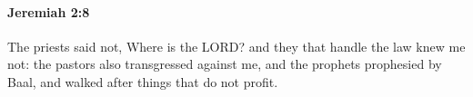 
		\paragraph{Jeremiah 2:8} %
			\label{JEREMIAH-2-8}

			The priests said not, Where is the LORD? and they that handle the law knew me not: the pastors also transgressed against me, and the prophets prophesied by Baal, and walked after things that do not profit.


